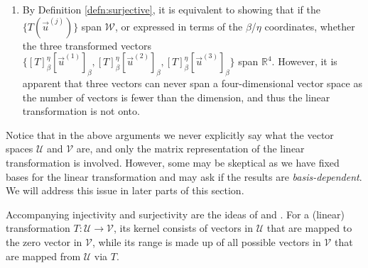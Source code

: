 \begin{solution}
\begin{enumerate}[label=(\alph*)]
\begin{align*}
    &\to 
    \left[\begin{array}{@{\,}wc{10pt}wc{10pt}wc{10pt}|wc{10pt}@{\,}}
    1 & -1 & 0 & 0 \\
    0 & 1 & 1 & 0\\
    0 & 0 & 1 & 0\\
    0 & 0 & -2 & 0
    \end{array}\right] & 
    -\frac{1}{2}R_3 \to R_3 \\
    &\to 
    \left[\begin{array}{@{\,}wc{10pt}wc{10pt}wc{10pt}|wc{10pt}@{\,}}
    1 & -1 & 0 & 0 \\
    0 & 1 & 1 & 0\\
    0 & 0 & 1 & 0\\
    0 & 0 & 0 & 0
    \end{array}\right] & 
    R_4 + 2R_3 \to R_4
    \end{align*}
    As every column in this homogeneous system contains a pivot, it demonstrates that $[T]_\beta^\eta[\vec{u}]_\beta = \textbf{0}$ indeed only has the trivial solution $[\vec{u}]_\beta = \textbf{0}$, and therefore the linear transformation in question is one-to-one.
    \item By Definition \ref{defn:surjective}, it is equivalent to showing that if the $\{T(\vec{u}^{(j)})\}$ span $\mathcal{W}$, or expressed in terms of the $\mathcal{\beta}$/$\mathcal{\eta}$ coordinates, whether the three transformed vectors $\{[T]_\beta^\eta[\vec{u}^{(1)}]_\beta, [T]_\beta^\eta[\vec{u}^{(2)}]_\beta, [T]_\beta^\eta[\vec{u}^{(3)}]_\beta\}$ span $\mathbb{R}^4$. However, it is apparent that three vectors can never span a four-dimensional vector space as the number of vectors is fewer than the dimension, and thus the linear transformation is not onto.
\end{enumerate}
Notice that in the above arguments we never explicitly say what the vector spaces $\mathcal{U}$ and $\mathcal{V}$ are, and only the matrix representation of the linear transformation is involved. However, some may be skeptical as we have fixed bases for the linear transformation and may ask if the results are \textit{basis-dependent}. We will address this issue in later parts of this section.
\end{solution}
Accompanying injectivity and surjectivity are the ideas of  and . For a (linear) transformation $T: \mathcal{U} \to \mathcal{V}$, its kernel consists of vectors in $\mathcal{U}$ that are mapped to the zero vector in $\mathcal{V}$, while its range is made up of all possible vectors in $\mathcal{V}$ that are mapped from $\mathcal{U}$ via $T$.
